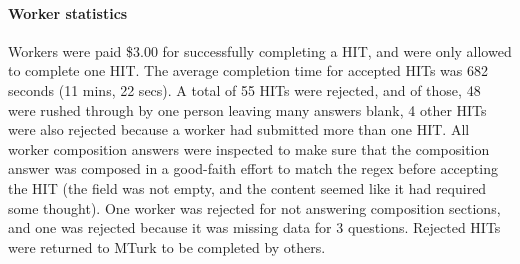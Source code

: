 \paragraph{Worker statistics}\label{sec:workerStatistics} Workers were paid \$3.00 for successfully completing a HIT, and were only allowed to complete  one HIT.  The average completion time for accepted HITs was 682 seconds (11 mins, 22 secs).
A total of 55 HITs were rejected, and  of those, 48 were rushed through by one person leaving many answers blank, 4 other HITs were also rejected because a worker had submitted more than one HIT.  All worker composition answers were inspected to make sure that the composition answer was composed in a good-faith effort to  match the regex before accepting the HIT (the field was not empty, and the content seemed like it had required some thought). One worker was rejected for not answering composition sections, and one was rejected because it was missing data for 3 questions.  Rejected HITs were returned to MTurk to be completed by others.
